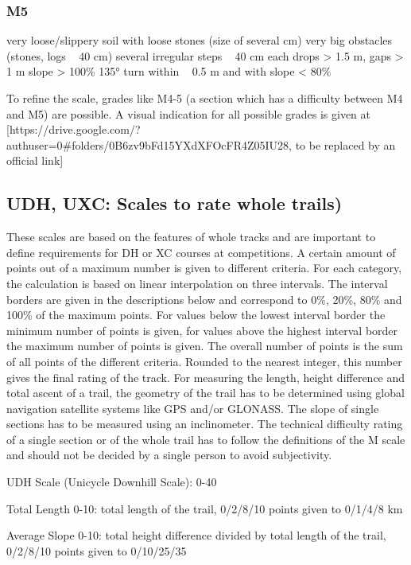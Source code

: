 \subsubsection{M5}
very loose/slippery soil with loose stones (size of several cm)
very big obstacles (stones, logs ~ 40 cm)
several irregular steps ~ 40 cm each
drops > 1.5 m, gaps > 1 m
slope > 100\%
135° turn within ~ 0.5 m and with slope < 80\%

To refine the scale, grades like M4-5 (a section which has a difficulty between
M4 and M5) are possible. A visual indication for all possible grades is given at
[https://drive.google.com/?authuser=0#folders/0B6zv9bFd15YXdXFOcFR4Z05IU28, to
be replaced by an official link]

\subsection{UDH, UXC: Scales to rate whole trails)}

These scales are based on the features of whole tracks and are important to
define requirements for DH or XC courses at competitions. A certain amount of
points out of a maximum number is given to different criteria. For each
category, the calculation is based on linear interpolation on three intervals.
The interval borders are given in the descriptions below and correspond to 0\%,
20\%, 80\% and 100\% of the maximum points. For values below the lowest interval
border the minimum number of points is given, for values above the highest
interval border the maximum number of points is given. The overall number of
points is the sum of all points of the different criteria. Rounded to the
nearest integer, this number gives the final rating of the track. For measuring
the length, height difference and total ascent of a trail, the geometry of the
trail has to be determined using global navigation satellite systems like GPS
and/or GLONASS. The slope of single sections has to be measured using an
inclinometer. The technical difficulty rating of a single section or of the
whole trail has to follow the definitions of the M scale and should not be
decided by a single person to avoid subjectivity.

UDH Scale (Unicycle Downhill Scale): 0-40

Total Length 0-10: total length of the trail, 0/2/8/10 points given to 0/1/4/8 km

Average Slope 0-10: total height difference divided by total length of the trail, 0/2/8/10 points given to 0/10/25/35%

